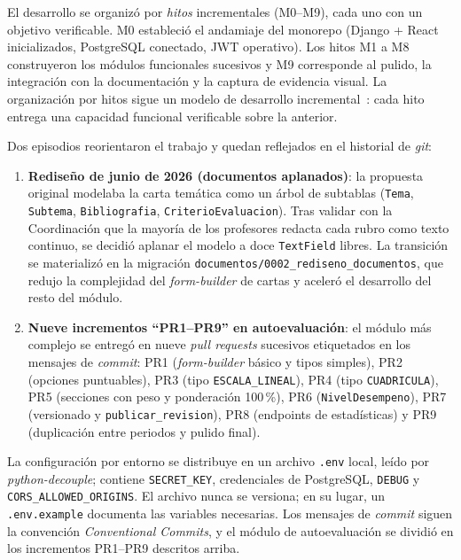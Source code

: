 El desarrollo se organizó por \emph{hitos} incrementales (M0--M9), cada uno con un objetivo verificable. M0 estableció el andamiaje del monorepo (Django + React inicializados, PostgreSQL conectado, JWT operativo). Los hitos M1 a M8 construyeron los módulos funcionales sucesivos y M9 corresponde al pulido, la integración con la documentación y la captura de evidencia visual. La organización por hitos sigue un modelo de desarrollo incremental~\cite{sommerville2011}: cada hito entrega una capacidad funcional verificable sobre la anterior.

Dos episodios reorientaron el trabajo y quedan reflejados en el historial de \emph{git}:

\begin{enumerate}
    \item \textbf{Rediseño de junio de 2026 (documentos aplanados)}: la propuesta original modelaba la carta temática como un árbol de subtablas (\texttt{Tema}, \texttt{Subtema}, \texttt{Bibliografia}, \texttt{CriterioEvaluacion}). Tras validar con la Coordinación que la mayoría de los profesores redacta cada rubro como texto continuo, se decidió aplanar el modelo a doce \texttt{TextField} libres. La transición se materializó en la migración \texttt{documentos/0002\_rediseno\_documentos}, que redujo la complejidad del \emph{form-builder} de cartas y aceleró el desarrollo del resto del módulo.
    \item \textbf{Nueve incrementos ``PR1--PR9'' en autoevaluación}: el módulo más complejo se entregó en nueve \emph{pull requests} sucesivos etiquetados en los mensajes de \emph{commit}: PR1 (\emph{form-builder} básico y tipos simples), PR2 (opciones puntuables), PR3 (tipo \texttt{ESCALA\_LINEAL}), PR4 (tipo \texttt{CUADRICULA}), PR5 (secciones con peso y ponderación 100\,\%), PR6 (\texttt{NivelDesempeno}), PR7 (versionado y \texttt{publicar\_revision}), PR8 (endpoints de estadísticas) y PR9 (duplicación entre periodos y pulido final).
\end{enumerate}

La configuración por entorno se distribuye en un archivo \texttt{.env} local, leído por \emph{python-decouple}; contiene \texttt{SECRET\_KEY}, credenciales de PostgreSQL, \texttt{DEBUG} y \texttt{CORS\_ALLOWED\_ORIGINS}. El archivo nunca se versiona; en su lugar, un \texttt{.env.example} documenta las variables necesarias. Los mensajes de \emph{commit} siguen la convención \emph{Conventional Commits}, y el módulo de autoevaluación se dividió en los incrementos PR1--PR9 descritos arriba.

